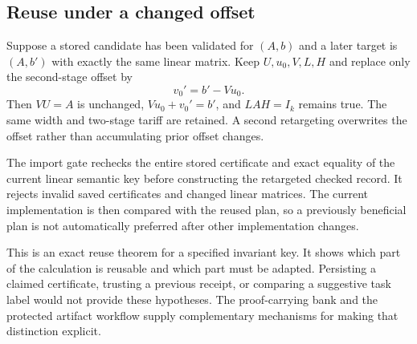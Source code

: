 \subsection{Reuse under a changed offset}

Suppose a stored candidate has been validated for $(A,b)$ and a later target is $(A,b')$ with exactly the same linear matrix. Keep $U,u_0,V,L,H$ and replace only the second-stage offset by
\[
 v_0'=b'-Vu_0.
\]
Then $VU=A$ is unchanged, $Vu_0+v_0'=b'$, and $LAH=I_k$ remains true. The same width and two-stage tariff are retained. A second retargeting overwrites the offset rather than accumulating prior offset changes.

The import gate rechecks the entire stored certificate and exact equality of the current linear semantic key before constructing the retargeted checked record. It rejects invalid saved certificates and changed linear matrices. The current implementation is then compared with the reused plan, so a previously beneficial plan is not automatically preferred after other implementation changes.

This is an exact reuse theorem for a specified invariant key. It shows which part of the calculation is reusable and which part must be adapted. Persisting a claimed certificate, trusting a previous receipt, or comparing a suggestive task label would not provide these hypotheses. The proof-carrying bank and the protected artifact workflow supply complementary mechanisms for making that distinction explicit.
